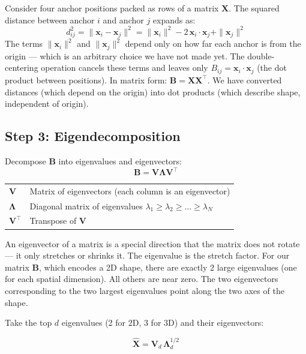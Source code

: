 \documentclass[11pt,a4paper]{article}
\newcommand{\vect}[1]{\bm{#1}}
\newcommand{\mat}[1]{\mathbf{#1}}
\begin{document}
\begin{plain}
Consider four anchor positions packed as rows of a matrix $\mat{X}$. The squared distance between anchor $i$ and anchor $j$ expands as:
\[
d_{ij}^2 = \|\vect{x}_i - \vect{x}_j\|^2 = \|\vect{x}_i\|^2 - 2\,\vect{x}_i \cdot \vect{x}_j + \|\vect{x}_j\|^2
\]
The terms $\|\vect{x}_i\|^2$ and $\|\vect{x}_j\|^2$ depend only on how far each anchor is from the origin --- which is an arbitrary choice we have not made yet. The double-centering operation cancels these terms and leaves only $B_{ij} = \vect{x}_i \cdot \vect{x}_j$ (the dot product between positions). In matrix form: $\mat{B} = \mat{X}\mat{X}^\top$. We have converted distances (which depend on the origin) into dot products (which describe shape, independent of origin).
\end{plain}

\subsection{Step 3: Eigendecomposition}

Decompose $\mat{B}$ into eigenvalues and eigenvectors:
\[
\mat{B} = \mat{V}\mat{\Lambda}\mat{V}^\top
\]

\begin{symbols}
\begin{tabular}{ll}
$\mat{V}$ & Matrix of eigenvectors (each column is an eigenvector) \\
$\mat{\Lambda}$ & Diagonal matrix of eigenvalues $\lambda_1 \geq \lambda_2 \geq \ldots \geq \lambda_N$ \\
$\mat{V}^\top$ & Transpose of $\mat{V}$ \\
\end{tabular}
\end{symbols}

\begin{plain}
An eigenvector of a matrix is a special direction that the matrix does not rotate --- it only stretches or shrinks it. The eigenvalue is the stretch factor. For our matrix $\mat{B}$, which encodes a 2D shape, there are exactly 2 large eigenvalues (one for each spatial dimension). All others are near zero. The two eigenvectors corresponding to the two largest eigenvalues point along the two axes of the shape.
\end{plain}

Take the top $d$ eigenvalues (2 for 2D, 3 for 3D) and their eigenvectors:

\begin{equation}
\hat{\mat{X}} = \mat{V}_d\,\mat{\Lambda}_d^{1/2}
\label{eq:mdssoln}
\end{equation}
\end{document}
